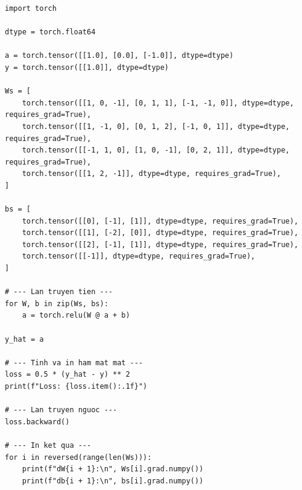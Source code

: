 \begin{lstlisting}[caption= Quá trình tính toán lan truyền tiến và lan truyền ngược bằng Pytorch.]
import torch

dtype = torch.float64

a = torch.tensor([[1.0], [0.0], [-1.0]], dtype=dtype)
y = torch.tensor([[1.0]], dtype=dtype)

Ws = [
    torch.tensor([[1, 0, -1], [0, 1, 1], [-1, -1, 0]], dtype=dtype, requires_grad=True),
    torch.tensor([[1, -1, 0], [0, 1, 2], [-1, 0, 1]], dtype=dtype, requires_grad=True),
    torch.tensor([[-1, 1, 0], [1, 0, -1], [0, 2, 1]], dtype=dtype, requires_grad=True),
    torch.tensor([[1, 2, -1]], dtype=dtype, requires_grad=True),
]

bs = [
    torch.tensor([[0], [-1], [1]], dtype=dtype, requires_grad=True),
    torch.tensor([[1], [-2], [0]], dtype=dtype, requires_grad=True),
    torch.tensor([[2], [-1], [1]], dtype=dtype, requires_grad=True),
    torch.tensor([[-1]], dtype=dtype, requires_grad=True),
]

# --- Lan truyen tien ---
for W, b in zip(Ws, bs):
    a = torch.relu(W @ a + b)

y_hat = a

# --- Tinh va in ham mat mat ---
loss = 0.5 * (y_hat - y) ** 2
print(f"Loss: {loss.item():.1f}")

# --- Lan truyen nguoc ---
loss.backward()

# --- In ket qua ---
for i in reversed(range(len(Ws))):
    print(f"dW{i + 1}:\n", Ws[i].grad.numpy())
    print(f"db{i + 1}:\n", bs[i].grad.numpy())
\end{lstlisting}